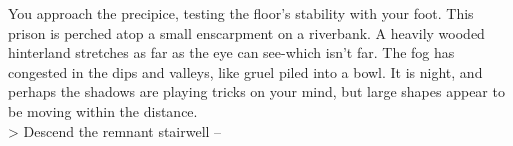 You approach the precipice, testing the floor’s stability with your foot. This prison is perched atop a small enscarpment on a riverbank. A heavily wooded hinterland stretches as far as the eye can see-which isn’t far. The fog has congested in the dips and valleys, like gruel piled into a bowl. It is night, and perhaps the shadows are playing tricks on your mind, but large shapes appear to be moving within the distance.\\

> Descend the remnant stairwell -- 